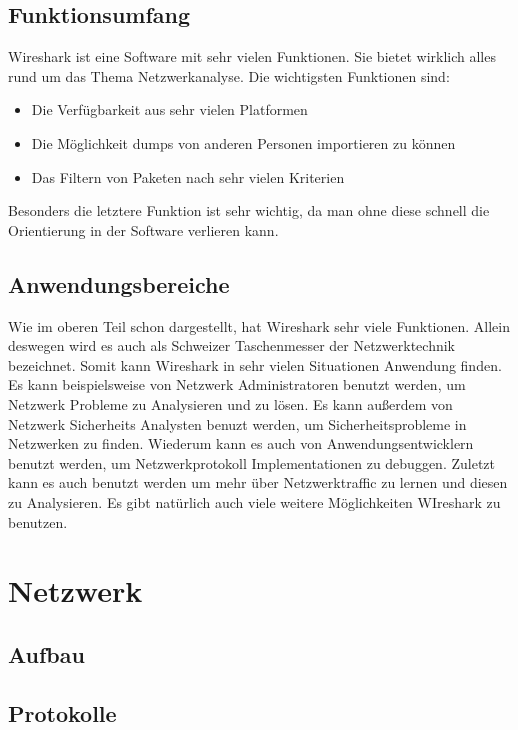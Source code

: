 \documentclass[12pt]{article}
\begin{document}
\subsection{Funktionsumfang}

Wireshark ist eine Software mit sehr vielen Funktionen. Sie bietet wirklich alles rund um das Thema Netzwerkanalyse. Die wichtigsten Funktionen sind:
\begin{itemize}
	\item Die Verfügbarkeit aus sehr vielen Platformen
	\item Die Möglichkeit dumps von anderen Personen importieren zu können
	\item Das Filtern von Paketen nach sehr vielen Kriterien
\end{itemize}
Besonders die letztere Funktion ist sehr wichtig, da man ohne diese schnell die Orientierung in der Software verlieren kann. \cite{features}

\subsection{Anwendungsbereiche}
Wie im oberen Teil schon dargestellt, hat Wireshark sehr viele Funktionen. Allein deswegen wird es auch als Schweizer Taschenmesser der Netzwerktechnik bezeichnet. Somit kann Wireshark in sehr vielen Situationen Anwendung finden. Es kann beispielsweise von Netzwerk Administratoren benutzt werden, um Netzwerk Probleme  zu Analysieren und zu lösen. Es kann außerdem von Netzwerk Sicherheits Analysten benuzt werden, um Sicherheitsprobleme in Netzwerken zu finden. Wiederum kann es auch von Anwendungsentwicklern benutzt werden, um Netzwerkprotokoll Implementationen zu debuggen. Zuletzt kann es auch benutzt werden um mehr über Netzwerktraffic zu lernen und diesen zu Analysieren. Es gibt natürlich auch viele weitere Möglichkeiten WIreshark zu benutzen. \cite{intendedpurposes}




\newpage



\section{Netzwerk}

\subsection{Aufbau}
\subsection{Protokolle}
\end{document}
